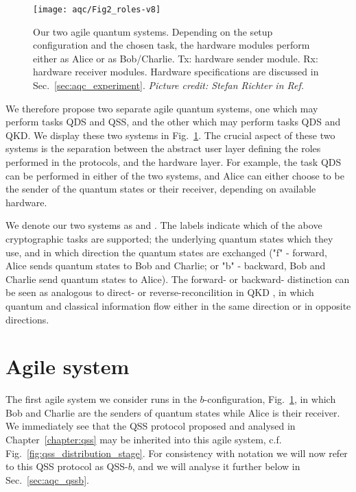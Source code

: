 \begin{figure}[htp]
\centering
\texttt{[image: aqc/Fig2\_roles-v8]}
\caption{\label{fig:agile_tasks} Our two agile quantum systems. Depending on the setup configuration and the chosen task, the hardware modules perform either as Alice or as Bob/Charlie. Tx: hardware sender module. Rx: hardware receiver modules. Hardware specifications are discussed in Sec.~\ref{sec:aqc_experiment}. \emph{Picture credit: Stefan Richter in Ref.~\cite{Richter2020}}}
\end{figure}

We therefore propose two separate agile quantum systems, one which may perform tasks QDS and QSS, and the other which may perform tasks QDS and QKD. We display these two systems in Fig.~\ref{fig:agile_tasks}. The crucial aspect of these two systems is the separation between the abstract user layer defining the roles performed in the protocols, and the hardware layer. For example, the task QDS can be performed in either of the two systems, and Alice can either choose to be the sender of the quantum states or their receiver, depending on available hardware.

We denote our two systems as \systemB \;and \systemF. The labels indicate which of the above cryptographic tasks are supported; the underlying quantum states which they use, and in which direction the quantum states are exchanged ("f" - forward, Alice sends quantum states to Bob and Charlie; or "b" - backward, Bob and Charlie send quantum states to Alice). The forward- or backward- distinction can be seen as analogous to direct- or reverse-reconcilition in QKD \cite{Laudenbach2017}, in which quantum and classical information flow either in the same direction or in opposite directions.




\clearpage
\section{Agile system \systemB}
The first agile system we consider runs in the $b$-configuration, Fig.~\ref{fig:agile_tasks}, in which Bob and Charlie are the senders of quantum states while Alice is their receiver. We immediately see that the QSS protocol proposed and analysed in Chapter~\ref{chapter:qss} may be inherited into this agile system, c.f. Fig.~\ref{fig:qss_distribution_stage}. For consistency with notation we will now refer to this QSS protocol as QSS-$b$, and we will analyse it further below in Sec.~\ref{sec:aqc_qssb}.

